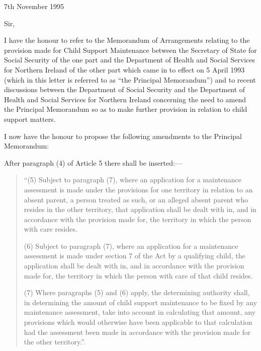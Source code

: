 \documentclass[a4paper]{article}
\begin{document}
7th November 1995

  Sir,

  I have the honour to refer to the Memorandum of Arrangements relating to the provision made for Child Support Maintenance between the Secretary of State for Social Security of the one part and the Department of Health and Social Services for Northern Ireland of the other part which came in to effect on 5 April 1993 (which in this letter is referred to as “the Principal Memorandum”) and to recent discussions between the Department of Social Security and the Department of Health and Social Services for Northern Ireland concerning the need to amend the Principal Memorandum so as to make further provision in relation to child support matters.

  I now have the honour to propose the following amendments to the Principal Memorandum:

  After paragraph (4) of Article 5 there shall be inserted:—
\begin{quotation}
 “(5) Subject to paragraph (7), where an application for a maintenance assessment is made under the provisions for one territory in relation to an absent parent, a person treated as such, or an alleged absent parent who resides in the other territory, that application shall be dealt with in, and in accordance with the provision made for, the territory in which the person with care resides.

(6) Subject to paragraph (7), where an application for a maintenance assessment is made under section 7 of the Act by a qualifying child, the application shall be dealt with in, and in accordance with the provision made for, the territory in which the person with care of that child resides.

(7) Where paragraphs (5) and (6) apply, the determining authority shall, in determining the amount of child support maintenance to be fixed by any maintenance assessment, take into account in calculating that amount, any provisions which would otherwise have been applicable to that calculation had the assessment been made in accordance with the provision made for the other territory.”.
\end{quotation}
\end{document}
